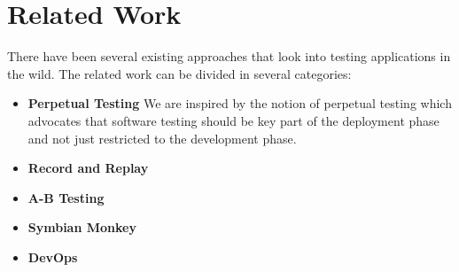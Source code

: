 
\section{Related Work}
\label{sec:related}

There have been several existing approaches that look into testing applications in the wild. 
The related work can be divided in several categories:

\begin{itemize}
  \item \textbf{Perpetual Testing}
    We are inspired by the notion of perpetual testing\cite{perpetual} which advocates that software testing should be key part of the deployment phase and not just restricted to the development phase.
  \item \textbf{Record and Replay}
  \item \textbf{A-B Testing}
  \item \textbf{Symbian Monkey}
   \item \textbf{DevOps}
\end{itemize}
  

